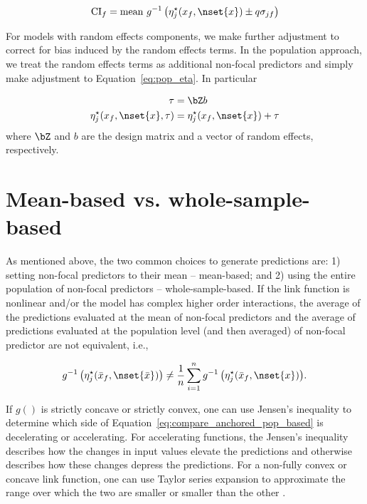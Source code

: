 \begin{align}
\mathrm{CI}_f = \mathrm{mean} ~ g^{-1} \left(\eta_j^\star(x_f, \nset{x}) \pm q\sigma_{jf}\right)
\end{align}


For models with random effects components, we make further adjustment to correct for bias induced by the random effects terms. In the population approach, we treat the random effects terms as additional non-focal predictors and simply make adjustment to Equation~\ref{eq:pop_eta}. In particular

\begin{align}\label{eq:pop_eta_re} 
\tau &= \bZ b \nonumber \\
\eta_j^\star(x_f, \nset{x}, \tau)  &= \eta_j^\star(x_f, \nset{x}) + \tau
\end{align}
where $\bZ$ and $b$ are the design matrix and a vector of random effects, respectively.

\section{Mean-based vs. whole-sample-based}

As mentioned above, the two common choices to generate predictions are: 1) setting non-focal predictors to their mean -- mean-based; and 2) using the entire population of non-focal predictors -- whole-sample-based. If the link function is nonlinear and/or the model has complex higher order interactions, the average of the predictions evaluated at the mean of non-focal predictors and the average of predictions evaluated at the population level (and then averaged) of non-focal predictor are not equivalent, i.e.,

\begin{align}\label{eq:compare_anchored_pop_based}
g^{-1} \left(\eta_j^\star(\bar{x}_f, \nset{\bar{x}})\right) \neq \frac{1}{n} \sum_{i=1}^n{ g^{-1} \left(\eta_j^\star(\bar{x}_f, \nset{x})\right)}.
\end{align}

If $g()$ is strictly concave or strictly convex, one can use Jensen's inequality to determine which side of Equation~\ref{eq:compare_anchored_pop_based} is decelerating or accelerating. For accelerating functions, the Jensen’s inequality describes how the changes in input values elevate the predictions and otherwise describes how these changes depress the predictions. For a non-fully convex or concave link function, one can use Taylor series expansion to approximate the range over which the two are smaller or smaller than the other \citep{hanmer2013behind}. 


